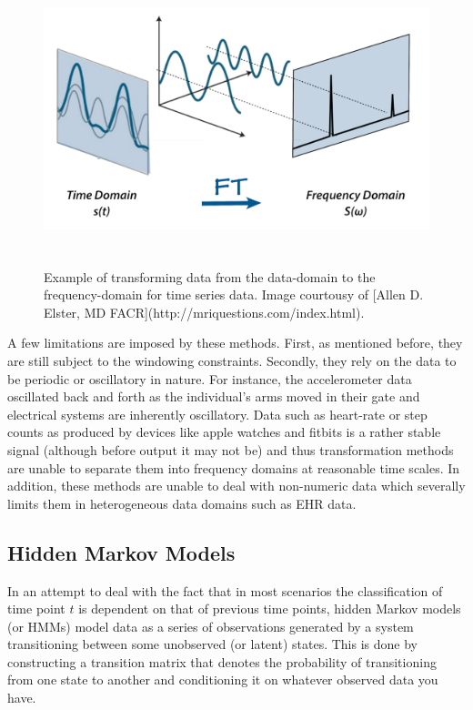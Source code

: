 \documentclass[]{book}
\theoremstyle{definition}
\theoremstyle{definition}
\theoremstyle{definition}
\theoremstyle{remark}
\begin{document}
\begin{figure}
\includegraphics[height=320]{figures/fourier_transform} \caption{Example of transforming data from the data-domain to the frequency-domain for time series data. Image courtousy of [Allen D. Elster, MD FACR](http://mriquestions.com/index.html).}\label{fig:fouriertransform}
\end{figure}

A few limitations are imposed by these methods. First, as mentioned
before, they are still subject to the windowing constraints. Secondly,
they rely on the data to be periodic or oscillatory in nature. For
instance, the accelerometer data oscillated back and forth as the
individual's arms moved in their gate and electrical systems are
inherently oscillatory. Data such as heart-rate or step counts as
produced by devices like apple watches and fitbits is a rather stable
signal (although before output it may not be) and thus transformation
methods are unable to separate them into frequency domains at reasonable
time scales. In addition, these methods are unable to deal with
non-numeric data which severally limits them in heterogeneous data
domains such as EHR data.

\subsection{Hidden Markov Models}\label{hidden-markov-models}

In an attempt to deal with the fact that in most scenarios the
classification of time point \(t\) is dependent on that of previous time
points, hidden Markov models (or HMMs) model data as a series of
observations generated by a system transitioning between some unobserved
(or latent) states. This is done by constructing a transition matrix
that denotes the probability of transitioning from one state to another
and conditioning it on whatever observed data you have.
\end{document}
